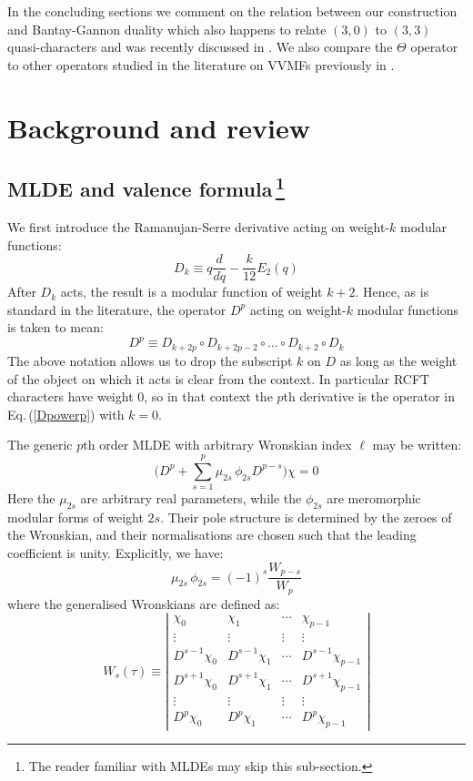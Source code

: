 \documentclass[11pt]{article}
\newcommand\be{\begin{equation}}
\newcommand\ee{\end{equation}}
\newcommand{\eref}[1]{Eq.\,(\ref{#1})}
\begin{document}
In the concluding sections we comment on the relation between our construction and Bantay-Gannon duality which also happens to relate $(3,0)$ to $(3,3)$ quasi-characters and was recently discussed in \cite{Govindarajan:2025jlq}. We also compare the $\Theta$ operator to other operators studied in the literature on VVMFs previously in \cite{Bantay:2010uy, nagatomo2022MLDE}.

\section{Background and review} \label{sec:bckgrd_11}

\subsection[MLDE and valence formula]{MLDE and valence formula\,\footnote{The reader familiar with MLDEs may skip this sub-section.}}

\label{sec:bckgrd}

We first introduce the Ramanujan-Serre derivative acting on weight-$k$ modular functions:
\be
D_k \equiv q\frac{d}{dq}-\frac{k}{12}E_2(q)
\ee
After $D_k$ acts, the result is a modular function of weight $k+2$. Hence, as is standard in the literature, the operator $D^p$ acting on weight-$k$ modular functions is taken to mean:
\be
D^p \equiv D_{k+2p}\circ D_{k+2p-2}\circ\ldots\circ D_{k+2}\circ D_k
\label{Dpowerp}
\ee
The above notation allows us to drop the subscript $k$ on $D$ as long as the weight of the object on which it acts is clear from the context. In particular RCFT characters have weight 0, so in that context the $p$th derivative is the operator in \eref{Dpowerp} with $k=0$.

The generic $p$th order MLDE with arbitrary Wronskian index $\ell$ may be written:
\be
\Big(D^p+\sum_{s=1}^p \mu_{2s}\,\phi_{2s} D^{p-s}\Big)\chi=0
\label{geneqn}
\ee
Here the $\mu_{2s}$ are arbitrary real parameters, while the $\phi_{2s}$ are meromorphic modular forms of weight $2s$. Their pole structure is determined by the zeroes of the Wronskian, and their normalisations are chosen such that the leading coefficient is unity. Explicitly, we have:
\be
\mu_{2s}\,\phi_{2s}=(-1)^{s}\frac{W_{p-s}}{W_p}
\label{phidef}
\ee
where the generalised Wronskians are defined as:
\be
W_{s}(\tau)\equiv \left| 
\begin{matrix}
\chi_0 & \chi_1& \cdots & \chi_{p-1}\\
\vdots & \vdots & \vdots & \vdots \\
D^{s-1}\chi_0 & D^{s-1} \chi_1 & \cdots & D^{s-1}\chi_{p-1}\\
D^{s+1}\chi_0 & D^{s+1} \chi_1 & \cdots & D^{s+1}\chi_{p-1}\\
\vdots & \vdots & \vdots & \vdots \\
D^{p}\chi_0 & D^{p} \chi_1
& \cdots & D^{p}\chi_{p-1}
\end{matrix}
\right|
\label{Wronskians}
\ee
\end{document}
